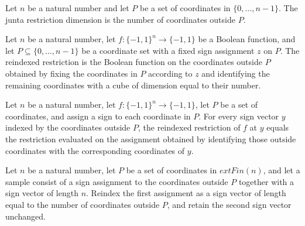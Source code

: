 \begin{definition}
\label{FABL.juntaRestrictionDimension}
\leanok
{}
Let $n$ be a natural number and let $P$ be a set of coordinates in $\{0,\ldots,n-1\}$.
The junta restriction dimension is the number of coordinates outside $P$.
\end{definition}

\begin{definition}
\label{FABL.reindexedJuntaRestriction}
\leanok
{}
Let $n$ be a natural number, let $f:\{-1,1\}^n\to\{-1,1\}$ be a Boolean function, and
let $P\subseteq\{0,\ldots,n-1\}$ be a coordinate set with a fixed sign assignment $z$ on
$P$. The reindexed restriction is the Boolean function on the coordinates outside $P$
obtained by fixing the coordinates in $P$ according to $z$ and identifying the remaining
coordinates with a cube of dimension equal to their number.
\end{definition}

\begin{theorem}
\label{FABL.reindexedJuntaRestriction_apply}
\leanok
{}
Let $n$ be a natural number, let $f\colon\{-1,1\}^n\to\{-1,1\}$, let $P$ be a set of
coordinates, and assign a sign to each coordinate in $P$. For every sign vector $y$
indexed by the coordinates outside $P$, the reindexed restriction of $f$ at $y$ equals
the restriction evaluated on the assignment obtained by identifying those outside
coordinates with the corresponding coordinates of $y$.
\end{theorem}

\begin{definition}
\label{FABL.reindexedJuntaRestrictionExample}
\leanok
{}
Let $n$ be a natural number, let $P$ be a set of coordinates in $	ext{Fin}(n)$, and let
a sample consist of a sign assignment to the coordinates outside $P$ together with a
sign vector of length $n$. Reindex the first assignment as a sign vector of length equal
to the number of coordinates outside $P$, and retain the second sign vector unchanged.
\end{definition}

